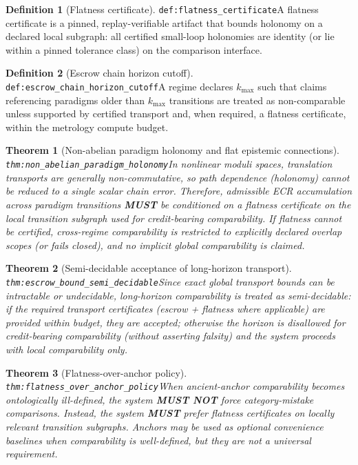 \documentclass[11pt]{article}
\theoremstyle{definition}
\newtheorem{definition}{Definition}
\theoremstyle{plain}
\newtheorem{theorem}{Theorem}
\newcommand{\MUST}{\textbf{MUST}}
\newcommand{\MUSTNOT}{\textbf{MUST NOT}}
\newcommand{\lbl}[1]{\texttt{\footnotesize\nolinkurl{#1}}}
\newcommand{\DefLabel}[1]{\hfill{\small\lbl{#1}}}
\newcommand{\kmax}{k_{\max}}
\begin{document}
\begin{definition}[Flatness certificate]\DefLabel{def:flatness_certificate}\label{def:flatness_certificate}
A flatness certificate is a pinned, replay-verifiable artifact that bounds holonomy on a declared local subgraph: all certified small-loop holonomies are identity (or lie within a pinned tolerance class) on the comparison interface.
\end{definition}

\begin{definition}[Escrow chain horizon cutoff]\DefLabel{def:escrow_chain_horizon_cutoff}\label{def:escrow_chain_horizon_cutoff}
A regime declares $\kmax$ such that claims referencing paradigms older than $\kmax$ transitions are treated as non-comparable unless supported by certified transport and, when required, a flatness certificate, within the metrology compute budget.
\end{definition}

\begin{theorem}[Non-abelian paradigm holonomy and flat epistemic connections]\DefLabel{thm:non_abelian_paradigm_holonomy}\label{thm:non_abelian_paradigm_holonomy}
In nonlinear moduli spaces, translation transports are generally non-commutative, so path dependence (holonomy) cannot be reduced to a single scalar chain error.
Therefore, admissible ECR accumulation across paradigm transitions \MUST{} be conditioned on a flatness certificate on the local transition subgraph used for credit-bearing comparability.
If flatness cannot be certified, cross-regime comparability is restricted to explicitly declared overlap scopes (or fails closed), and no implicit global comparability is claimed.
\end{theorem}

\begin{theorem}[Semi-decidable acceptance of long-horizon transport]\DefLabel{thm:escrow_bound_semi_decidable}\label{thm:escrow_bound_semi_decidable}
Since exact global transport bounds can be intractable or undecidable, long-horizon comparability is treated as semi-decidable:
if the required transport certificates (escrow + flatness where applicable) are provided within budget, they are accepted; otherwise the horizon is disallowed for credit-bearing comparability (without asserting falsity) and the system proceeds with local comparability only.
\end{theorem}

\begin{theorem}[Flatness-over-anchor policy]\DefLabel{thm:flatness_over_anchor_policy}\label{thm:flatness_over_anchor_policy}
When ancient-anchor comparability becomes ontologically ill-defined, the system \MUSTNOT{} force category-mistake comparisons.
Instead, the system \MUST{} prefer flatness certificates on locally relevant transition subgraphs.
Anchors may be used as optional convenience baselines when comparability is well-defined, but they are not a universal requirement.
\end{theorem}
\end{document}
